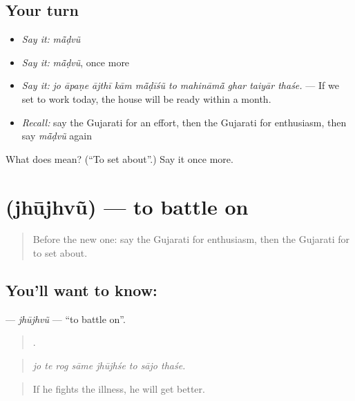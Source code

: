 \subsection*{Your turn}
\begin{itemize}
\raggedright
  \item \emph{Say it:} \emph{mā̃ḍvũ}
  \item \emph{Say it:} \emph{mā̃ḍvũ}, once more
  \item \emph{Say it:} \emph{jo āpaṇe ājthī kām mā̃ḍīśũ to mahināmā̃ ghar taiyār thaśe.} — If we set to work today, the house will be ready within a month.
  \item \emph{Recall:} say the Gujarati for an effort, then the Gujarati for enthusiasm, then say \emph{mā̃ḍvũ} again
\end{itemize}

\begin{tcolorbox}[breakable,colback=teal!4,colframe=teal!35!black,title={Before you move on}]
What does  mean? (\textquotedblleft{}To set about\textquotedblright{}.) Say it once more.
\end{tcolorbox}
\section[\texorpdfstring{\gu{ઝૂઝવું} (jhūjhvũ)}{ઝૂઝવું (jhūjhvũ)}]{ (jhūjhvũ) — to battle on}

\label{lesson:GU-C383-jhujhvu}



\begin{quote}
Before the new one: say the Gujarati for enthusiasm, then the Gujarati for to set about.
\end{quote}

\subsection*{You'll want to know: }
\textbf{} — \emph{jhūjhvũ} — \textquotedblleft{}to battle on\textquotedblright{}.

\begin{quote}
       .
\end{quote}

\begin{quote}
\emph{jo te rog sāme jhūjhśe to sājo thaśe.}
\end{quote}

\begin{quote}
If he fights the illness, he will get better.
\end{quote}

